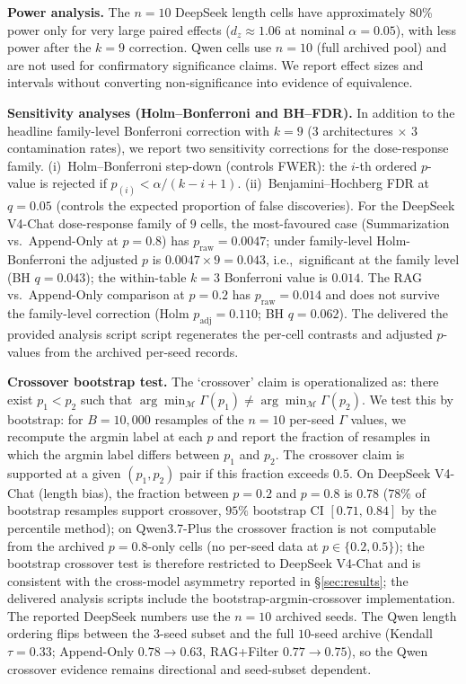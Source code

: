 \documentclass[11pt]{article}
\begin{document}
\textbf{Power analysis.} The $n=10$ DeepSeek length cells have approximately 80\% power only for very large paired effects ($d_z\approx1.06$ at nominal $\alpha=0.05$), with less power after the $k=9$ correction. Qwen cells use $n=10$ (full archived pool) and are not used for confirmatory significance claims. We report effect sizes and intervals without converting non-significance into evidence of equivalence.

\noindent\textbf{Sensitivity analyses (Holm--Bonferroni and BH--FDR).} In addition to the headline family-level Bonferroni correction with $k=9$ (3 architectures $\times$ 3 contamination rates), we report two sensitivity corrections for the dose-response family. (i)~Holm--Bonferroni step-down (controls FWER): the $i$-th ordered $p$-value is rejected if $p_{(i)} < \alpha / (k - i + 1)$. (ii)~Benjamini--Hochberg FDR at $q=0.05$ (controls the expected proportion of false discoveries). For the DeepSeek V4-Chat dose-response family of $9$ cells, the most-favoured case (Summarization vs.\ Append-Only at $p=0.8$) has $p_{\text{raw}}=0.0047$; under family-level Holm-Bonferroni the adjusted $p$ is $0.0047 \times 9 = 0.043$, i.e.,\ significant at the family level (BH $q = 0.043$); the within-table $k{=}3$ Bonferroni value is $0.014$. The RAG vs.\ Append-Only comparison at $p=0.2$ has $p_{\text{raw}}=0.014$ and does not survive the family-level correction (Holm $p_{\text{adj}}=0.110$; BH $q=0.062$). The delivered the provided analysis script script regenerates the per-cell contrasts and adjusted $p$-values from the archived per-seed records.

\noindent\textbf{Crossover bootstrap test.} The `crossover' claim is operationalized as: there exist $p_1 < p_2$ such that $\arg\min_{\mathcal{M}} \Gamma(p_1) \neq \arg\min_{\mathcal{M}} \Gamma(p_2)$. We test this by bootstrap: for $B = 10{,}000$ resamples of the $n=10$ per-seed $\Gamma$ values, we recompute the argmin label at each $p$ and report the fraction of resamples in which the argmin label differs between $p_1$ and $p_2$. The crossover claim is supported at a given $(p_1, p_2)$ pair if this fraction exceeds $0.5$. On DeepSeek V4-Chat (length bias), the fraction between $p=0.2$ and $p=0.8$ is $0.78$ ($78\%$ of bootstrap resamples support crossover, $95\%$ bootstrap CI $[0.71,\,0.84]$ by the percentile method); on Qwen3.7-Plus the crossover fraction is not computable from the archived $p{=}0.8$-only cells (no per-seed data at $p \in \{0.2, 0.5\}$); the bootstrap crossover test is therefore restricted to DeepSeek V4-Chat and is consistent with the cross-model asymmetry reported in \S\ref{sec:results}; the delivered analysis scripts include the bootstrap-argmin-crossover implementation. The reported DeepSeek numbers use the $n{=}10$ archived seeds. The Qwen length ordering flips between the $3$-seed subset and the full $10$-seed archive (Kendall $\tau = 0.33$; Append-Only $0.78 \to 0.63$, RAG+Filter $0.77 \to 0.75$), so the Qwen crossover evidence remains directional and seed-subset dependent.
\end{document}
